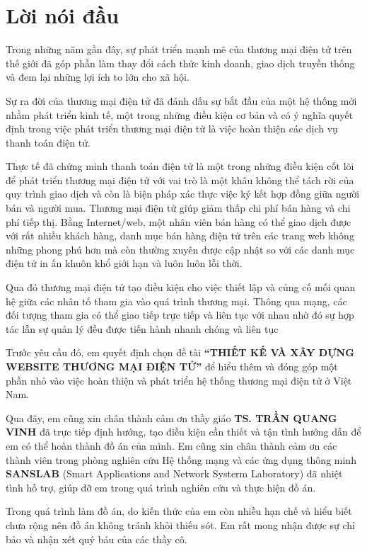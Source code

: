 \thispagestyle{plain}
\chapter*{Lời nói đầu}
Trong những năm gần đây, sự phát triển mạnh mẽ của thương mại điện tử trên thế giới đã góp phần làm thay đổi cách thức kinh doanh, giao dịch truyền thống và đem lại những lợi ích to lớn cho xã hội.
\par
Sự ra đời của thương mại điện tử đã đánh dấu sự bắt đầu của một hệ thống mới nhằm phát triển kinh tế, một trong những điều kiện cơ bản và có ý nghĩa quyết định trong việc phát triển thương mại điện tử là việc hoàn thiện các dịch vụ thanh toán điện tử.
\par 
Thực tế đã chứng minh thanh toán điện tử là một trong những điều kiện cốt lõi để phát triển thương mại điện tử với vai trò là một khâu không thể tách rời của quy trình giao dịch và còn là biện pháp xác thực việc ký kết hợp đồng giữa người bán và người mua. Thương mại điện tử giúp giảm thấp chi phí bán hàng và chi phí tiếp thị. Bằng Internet/web, một nhân viên bán hàng có thể giao dịch được với rất nhiều khách hàng, danh mục bán hàng điện tử trên các trang web không những phong phú hơn mà còn thường xuyên được cập nhật so với các danh mục điện tử in ấn khuôn khổ giới hạn và luôn luôn lỗi thời.
\par
Qua đó thương mại điện tử tạo điều kiện cho việc thiết lập và củng cố mối quan hệ giữa các nhân tố tham gia vào quá trình thương mại. Thông qua mạng, các đối tượng tham gia có thể giao tiếp trực tiếp và liên tục với nhau nhờ đó sự hợp tác lẫn sự
quản lý đều được tiến hành nhanh chóng và liên tục
\par 
Trước yêu cầu đó, em quyết định chọn đề tài \textbf{“THIẾT KẾ VÀ XÂY DỰNG WEBSITE THƯƠNG MẠI ĐIỆN TỬ”} để hiểu thêm và đóng góp một phần nhỏ vào việc hoàn thiện và phát triển hệ thống thương mại điện tử ở Việt Nam.
\par
Qua đây, em cũng xin chân thành cảm ơn thầy giáo \textbf{TS. TRẦN QUANG VINH} đã trực tiếp định hướng, tạo điều kiện cần thiết và tận tình hướng dẫn để em có thể hoàn thành đồ án của mình. Em cũng xin chân thành cảm ơn các thành viên trong phòng nghiên cứu Hệ thống mạng và các ứng dụng thông minh \textbf{SANSLAB} (Smart Applications and Network Systerm Laboratory) đã nhiệt tình hỗ trợ, giúp đỡ em trong quá trình nghiên cứu và thực hiện đồ án.
\par
Trong quá trình làm đồ án, do kiến thức của em còn nhiều hạn chế và hiểu biết chưa rộng nên đồ án không tránh khỏi thiếu sót. Em rất mong nhận được sự chỉ bảo và nhận xét quý báu của các thầy cô.
